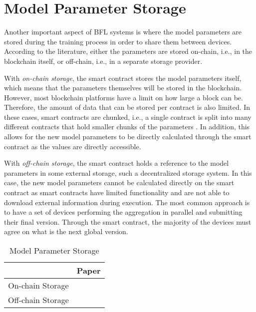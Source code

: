\section{Model Parameter Storage}\label{related_work:param_storage}

Another important aspect of BFL systems is where the model parameters are stored during the training process in order to share them between devices. According to the literature, either the parameters are stored on-chain, i.e., in the blockchain itself, or off-chain, i.e., in a separate storage provider.

With \textit{on-chain storage}, the smart contract stores the model parameters itself, which means that the parameters themselves will be stored in the blockchain. However, most blockchain platforms have a limit on how large a block can be. Therefore, the amount of data that can be stored per contract is also limited. In these cases, smart contracts are chunked, i.e., a single contract is split into many different contracts that hold smaller chunks of the parameters \cite{9274451, baffle}. In addition, this allows for the new model parameters to be directly calculated through the smart contract as the values are directly accessible.
    
With \textit{off-chain storage}, the smart contract holds a reference to the model parameters in some external storage, such a decentralized storage system. In this case, the new model parameters cannot be calculated directly on the smart contract as smart contracts have limited functionality and are not able to download external information during execution. The most common approach is to have a set of devices performing the aggregation in parallel and submitting their final version. Through the smart contract, the majority of the devices must agree on what is the next global version.

\begin{table}[!b]
\begin{tabular}{c|c} \hline \hline
                  & Paper \\ \hline \hline
On-chain Storage  & \cite{9274451, baffle, demo, 8733825, 9524833, 8894364, 9184854, 8893114}\\ \hline
Off-chain Storage & \cite{10.1145/3319535.3363256, 10.48550/arxiv.2011.07516, 8945913, 10.48550/arxiv.2202.02817, 10.48550/arxiv.2007.03856, 10.48550/arxiv.1910.12603, Peyvandi2022, 9170559} \\      \hline
\end{tabular}
\caption{Model Parameter Storage}\label{tab:storage}
\end{table}

